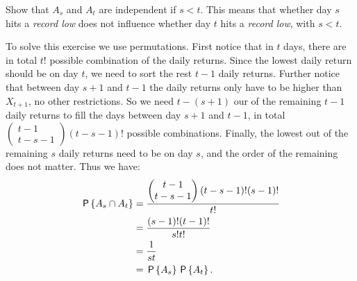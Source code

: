 \begin{exercise}[1.5]
Show that $A_s$ and $A_t$ are independent if $s < t$. This means that whether day $s$ hits a \textit{record low} does not influence whether day $t$ hits a \textit{record low}, with $s<t$.
\begin{solution}
  To solve this exercise we use permutations. First notice that in $t$ days, there are in total $t!$ possible combination of the  daily returns. Since the lowest daily return should be on day $t$, we need to sort the rest $t-1$ daily returns. Further notice that between day $s+1$ and $t-1$ the daily returns only have to be higher than $X_{t+1}$, no other restrictions. So we need $t-(s+1)$ our of the remaining $t-1$ daily returns to fill the days between day $s+1$ and $t-1$, in total $\begin{pmatrix}t-1\\t-s-1\end{pmatrix}(t-s-1)!$ possible combinations. Finally, the lowest out of the remaining $s$ daily returns need to be on day $s$, and the order of the remaining does not matter. Thus we have:
    \begin{align*}
       \P{A_s \cap A_t}&=\frac{\begin{pmatrix}t-1\\t-s-1\end{pmatrix}(t-s-1)!(s-1)!}{t!}\\
       &=\frac{(s-1)!(t-1)!}{s!t!}\\
       &=\frac{1}{st}\\
       &=\P{A_s}\P{A_t}.
    \end{align*}
\end{solution}
\end{exercise}




